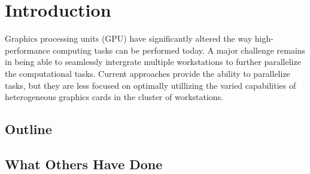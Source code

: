 \section{Introduction}

Graphics processing units (GPU) have significantly altered the way
high-performance computing tasks can be performed today. A major challenge
remains in being able to seamlessly intergrate multiple workstations to further
parallelize the computational tasks. Current approaches provide the ability to
parallelize tasks, but they are less focused on optimally utillizing the varied
capabilities of heterogeneous graphics cards in the cluster of workstations.\\

\subsection{Outline}

\subsection{What Others Have Done}
